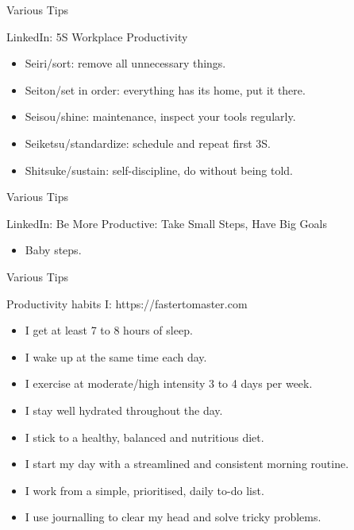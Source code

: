 \begin{frame}{Various Tips}
  \begin{block}{LinkedIn: 5S Workplace Productivity}
    \begin{itemize}
      \item Seiri/sort: remove all unnecessary things.
      \item Seiton/set in order: everything has its home, put it there.
      \item Seisou/shine: maintenance, inspect your tools regularly.
      \item Seiketsu/standardize: schedule and repeat first 3S.
      \item Shitsuke/sustain: self-discipline, do without being told.
    \end{itemize}
  \end{block}
\end{frame}

\begin{frame}{Various Tips}
  \begin{block}{LinkedIn: Be More Productive: Take Small Steps, Have Big Goals}
    \begin{itemize}
      \item Baby steps. 
    \end{itemize}
  \end{block}
\end{frame}

\begin{frame}{Various Tips}
  \begin{block}{Productivity habits I: https://fastertomaster.com}
    \begin{itemize}
      \item I get at least 7 to 8 hours of sleep.
      \item I wake up at the same time each day.
      \item I exercise at moderate/high intensity 3 to 4 days per week.
      \item I stay well hydrated throughout the day.
      \item I stick to a healthy, balanced and nutritious diet.
      \item I start my day with a streamlined and consistent morning routine.
      \item I work from a simple, prioritised, daily to-do list.
      \item I use journalling to clear my head and solve tricky problems.
    \end{itemize}
  \end{block}
\end{frame}

